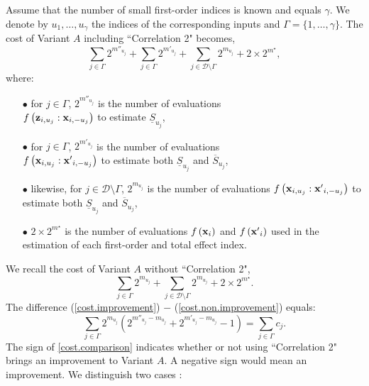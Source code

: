 Assume that the number of small first-order indices is known and equals $\gamma$. We denote by $u_1,\dots,u_{\gamma}$ the indices of the corresponding inputs and $\Gamma = \{1,\dots,\gamma\}$. The cost of Variant $A$ including ``Correlation 2" becomes, 
\begin{equation}
\sum \limits_{j \in \Gamma} 2^{m''_{u_j}} + \sum \limits_{j \in \Gamma} 2^{m'_{u_j}} + \sum \limits_{j \in \mathcal{D}\setminus{\Gamma}} 2^{m_{u_j}} + 2 \times 2^{m^\star},
\label{cost.improvement}
\end{equation}
where: %
\begin{itemize}
\item[$\bullet$] for $j\in \Gamma$, $2^{m''_{u_j}}$ is the number of evaluations \\ $f\left(\boldsymbol{\mathbf{z}}_{i,u_j}:\boldsymbol{\mathbf{x}}_{i,-u_j}\right)$ to estimate $\underline{S}_{u_j}$,
\item[$\bullet$] for $j\in \Gamma$, $2^{m'_{u_j}}$ is the number of evaluations \\ $f\left(\boldsymbol{\mathbf{x}}_{i,u_j}:{\boldsymbol{\mathbf{x}}'}_{i,-u_j}\right)$ to estimate both $\underline{S}_{u_j}$ and  $\overline{S}_{u_j}$,
\item[$\bullet$] likewise, for $j\in \mathcal{D}\setminus{\Gamma}$, $ 2^{m_{u_j}}$ is the number of evaluations $f\left(\boldsymbol{\mathbf{x}}_{i,u_j}:{\boldsymbol{\mathbf{x}}'}_{i,-u_j}\right)$ to estimate both $\underline{S}_{u_j}$ and  $\overline{S}_{u_j}$,
\item[$\bullet$] $2 \times 2^{m^{\star}}$ is the number of evaluations $f\left(\boldsymbol{\mathbf{x}}_{i}\right)$ and $f\left({\boldsymbol{\mathbf{x}}'}_{i}\right)$ used in the estimation of each first-order and total effect index.
\end{itemize}
We recall the cost of Variant $A$ without  ``Correlation 2",
\begin{equation}
\sum \limits_{j \in \Gamma} 2^{m_{u_j}} + \sum \limits_{j \in \mathcal{D}\setminus{\Gamma}} 2^{m_{u_j}} + 2 \times 2^{m^{\star}}. 
\label{cost.non.improvement}
\end{equation}
The difference (\ref{cost.improvement}) $-$ (\ref{cost.non.improvement}) equals:
\begin{equation}
 \sum \limits_{j \in \Gamma} 2^{m_{u_j}} \left(2^{m''_{u_j}-m_{u_j}}  + 2^{m'_{u_j}-m_{u_j}} - 1 \right) = \sum \limits_{j \in \Gamma} c_j.
\label{cost.comparison}
\end{equation}
{\color{purple}  The sign of \eqref{cost.comparison} indicates whether or not using ``Correlation 2" brings an improvement to Variant $A$. A negative sign would mean an improvement.} We distinguish two cases :
